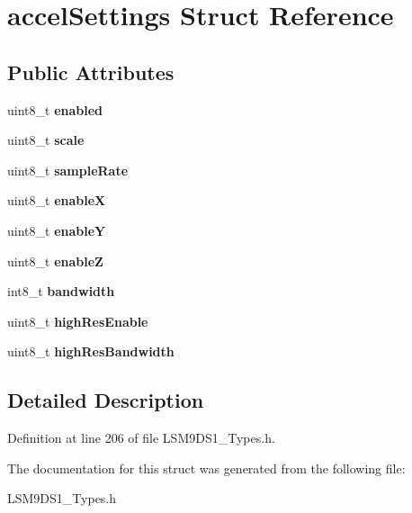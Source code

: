 \hypertarget{structaccelSettings}{}\section{accel\+Settings Struct Reference}
\label{structaccelSettings}
\subsection*{Public Attributes}
\begin{DoxyCompactItemize}
\item 
\mbox{\label{structaccelSettings_a6ecaf7abfbaf7e74c6986fd93798ad4b}} 
uint8\+\_\+t {\bfseries enabled}
\item 
\mbox{\label{structaccelSettings_a3a0a38e5e32ad21fcf8e880f37c0de1e}} 
uint8\+\_\+t {\bfseries scale}
\item 
\mbox{\label{structaccelSettings_a51704cb40f1e72ec298f601fedcc6092}} 
uint8\+\_\+t {\bfseries sample\+Rate}
\item 
\mbox{\label{structaccelSettings_a8cd5546cda8657ad2405d378fc815b9a}} 
uint8\+\_\+t {\bfseries enableX}
\item 
\mbox{\label{structaccelSettings_a3f9ff5abfde83c5a59808faeb5ad4c6c}} 
uint8\+\_\+t {\bfseries enableY}
\item 
\mbox{\label{structaccelSettings_abdb5ee5fb9a802315d8340ea5d83b587}} 
uint8\+\_\+t {\bfseries enableZ}
\item 
\mbox{\label{structaccelSettings_ab64c80f62ecfeb3041744febaed9407b}} 
int8\+\_\+t {\bfseries bandwidth}
\item 
\mbox{\label{structaccelSettings_ad165444ae7996ff6160be01d77d33b62}} 
uint8\+\_\+t {\bfseries high\+Res\+Enable}
\item 
\mbox{\label{structaccelSettings_a3925a8342b5a4b3caecd187e729954f3}} 
uint8\+\_\+t {\bfseries high\+Res\+Bandwidth}
\end{DoxyCompactItemize}


\subsection{Detailed Description}


Definition at line 206 of file L\+S\+M9\+D\+S1\+\_\+\+Types.\+h.



The documentation for this struct was generated from the following file\+:\begin{DoxyCompactItemize}
\item 
L\+S\+M9\+D\+S1\+\_\+\+Types.\+h\end{DoxyCompactItemize}
